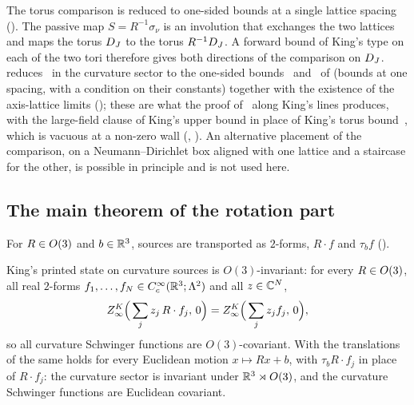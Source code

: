 The torus comparison is reduced to one-sided bounds at a single lattice spacing (). The passive map $S=R^{-1}\sigma_\nu$ is an involution that exchanges the two lattices and maps the torus $D_J$ to the torus $R^{-1}D_J$. A forward bound of King's type on each of the two tori therefore gives both directions of the comparison on $D_J$.  reduces \Kz\ in the curvature sector to the one-sided bounds \hypFz\ and \hypV\ of  (bounds at one spacing, with a condition on their constants) together with the existence of the axis-lattice limits (); these are what the proof of \Kz\ along King's lines produces, with the large-field clause of King's upper bound in place of King's torus bound~\cite[(4.2)]{K2}, which is vacuous at a non-zero wall (, ). An alternative placement of the comparison, on a Neumann--Dirichlet box aligned with one lattice and a staircase for the other, is possible in principle and is not used here.

\subsection{The main theorem of the rotation part}

For $R\in O(3)$ and $b\in\mathbb R^3$, sources are transported as $2$-forms, $R\cdot f$ and $\tau_bf$ ().

\begin{theorem}\label{rot:thm:main}
King's printed state on curvature sources is $O(3)$-invariant: for every $R\in O(3)$, all real $2$-forms $f_1,\dots,f_N\in C^\infty_c(\mathbb R^3;\Lambda^2)$ and all $z\in\mathbb C^N$,
\[
Z^{K}_{\infty}\Big(\sum_jz_j\,R\cdot f_j,\,0\Big)=Z^{K}_{\infty}\Big(\sum_jz_jf_j,\,0\Big),
\]
so all curvature Schwinger functions are $O(3)$-covariant. With the translations of  the same holds for every Euclidean motion $x\mapsto Rx+b$, with $\tau_bR\cdot f_j$ in place of $R\cdot f_j$: the curvature sector is invariant under $\mathbb R^3\rtimes O(3)$, and the curvature Schwinger functions are Euclidean covariant.
\end{theorem}

